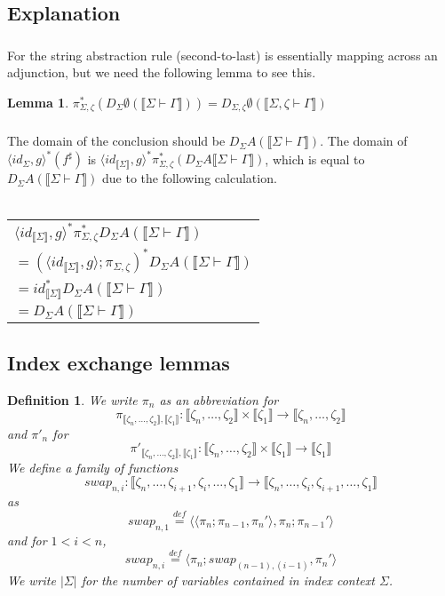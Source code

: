\documentclass{article}
\newtheorem{lemma}{Lemma}
\newtheorem{definition}{Definition}
\newcommand{\sem}[1]{\llbracket #1 \rrbracket}
\newcommand{\defeq}{\overset{\mathit{def}}{=}}
\begin{document}
\subsection*{Explanation}

\subsubsection*{}
For the string abstraction rule (second-to-last) is essentially mapping across an adjunction, but we need the following lemma to see this.
\begin{lemma}
$\pi^*_{\Sigma,\zeta}(D_{\Sigma} \emptyset(\sem{\Sigma \vdash \Gamma})) = D_{\Sigma,\zeta} \emptyset(\sem{\Sigma,\zeta \vdash \Gamma})$
\end{lemma}

\subsubsection*{}

The domain of the conclusion should be $D_{\Sigma}A(\sem{\Sigma \vdash \Gamma})$. The domain of $\langle \mathit{id}_{\Sigma}, g \rangle^*(f^\sharp)$ is $\langle \mathit{id}_{\sem{\Sigma}}, g \rangle^* \pi_{\Sigma,\zeta}^*(D_{\Sigma} A \sem{\Sigma \vdash \Gamma})$, which is equal to $D_{\Sigma}A(\sem{\Sigma \vdash \Gamma})$ due to the following calculation.\\~\\
\begin{tabu}{l}
$\langle \mathit{id}_{\sem{\Sigma}}, g \rangle^* \pi_{\Sigma,\zeta}^* D_{\Sigma} A (\sem{\Sigma \vdash \Gamma})$ \\
$= (\langle \mathit{id}_{\sem{\Sigma}}, g \rangle; \pi_{\Sigma,\zeta})^* D_{\Sigma} A (\sem{\Sigma \vdash \Gamma})$ \\
$= id_{\sem{\Sigma}}^* D_{\Sigma} A (\sem{\Sigma \vdash \Gamma})$ \\
$= D_{\Sigma} A (\sem{\Sigma \vdash \Gamma})$
\end{tabu}

\subsection*{Index exchange lemmas}

\begin{definition}
We write $\pi_n$ as an abbreviation for $$\pi_{\sem{\zeta_n,\ldots,\zeta_{2}},\sem{\zeta_1}} : \sem{\zeta_n,\ldots,\zeta_{2}} \times \sem{\zeta_1} \to \sem{\zeta_n,\ldots,\zeta_{2}}$$ and $\pi'_n$ for $$\pi'_{\sem{\zeta_n,\ldots,\zeta_{2}},\sem{\zeta_1}} : \sem{\zeta_n,\ldots,\zeta_{2}} \times \sem{\zeta_1} \to \sem{\zeta_1}$$ We define a family of functions $$\mathit{swap}_{n,i} : \sem{\zeta_n,\ldots,\zeta_{i+1},\zeta_i,\ldots,\zeta_1} \to \sem{\zeta_n,\ldots,\zeta_i,\zeta_{i+1},\ldots,\zeta_1}$$ as $$\mathit{swap}_{n,1} \defeq \langle \langle \pi_n; \pi_{n-1}, \pi_n' \rangle, \pi_n;\pi_{n-1}' \rangle$$ and for $1 < i < n$, $$\mathit{swap}_{n,i} \defeq \langle \pi_n;\mathit{swap}_{(n-1),(i-1)}, \pi_n' \rangle$$
We write $|\Sigma|$ for the number of variables contained in index context $\Sigma$.
\end{definition}
\end{document}
